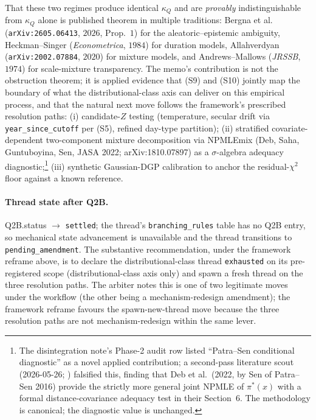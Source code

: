 \documentclass[11pt]{article}
\theoremstyle{definition}
\theoremstyle{plain}
\begin{document}
That these two regimes produce identical $\kappa_{Q}$ and are
\emph{provably} indistinguishable from $\kappa_{Q}$ alone is
published theorem in multiple traditions: Bergna et al.
(\texttt{arXiv:2605.06413}, $2026$, Prop.~$1$) for the aleatoric--epistemic
ambiguity, Heckman--Singer (\emph{Econometrica}, $1984$) for
duration models, Allahverdyan (\texttt{arXiv:2002.07884}, $2020$)
for mixture models, and Andrews--Mallows (\emph{JRSSB}, $1974$)
for scale-mixture transparency. The memo's contribution is not
the obstruction theorem; it is applied evidence that (S9) and
(S10) jointly map the boundary of what the distributional-class
axis can deliver on this empirical process, and that the natural
next move follows the framework's prescribed resolution paths:
(i) candidate-$Z$ testing (temperature, secular drift via
\texttt{year\_since\_cutoff} per (S5), refined day-type partition);
(ii) stratified covariate-dependent two-component mixture
decomposition via NPMLEmix (Deb, Saha, Guntuboyina, Sen, JASA
2022; arXiv:1810.07897) as a $\sigma$-algebra adequacy
diagnostic;\footnote{The disintegration note's Phase-2 audit row
listed ``Patra--Sen conditional diagnostic'' as a novel applied
contribution; a second-pass literature scout (2026-05-26;
)
falsified this, finding that Deb et al.\ (2022, by Sen of
Patra--Sen 2016) provide the strictly more general joint NPMLE
of $\pi^*(x)$ with a formal distance-covariance adequacy test in
their Section~6. The methodology is canonical; the diagnostic
value is unchanged.} (iii) synthetic Gaussian-DGP calibration to
anchor the residual-$\chi^{2}$ floor against a known reference.

\paragraph{Thread state after Q2B.}
Q2B.status $\to$ \texttt{settled}; the thread's
\texttt{branching\_rules} table has no Q2B entry, so mechanical
state advancement is unavailable and the thread transitions to
\texttt{pending\_amendment}. The substantive recommendation,
under the framework reframe above, is to declare the
distributional-class thread \texttt{exhausted} on its
pre-registered scope (distributional-class axis only) and spawn
a fresh thread on the three resolution paths. The arbiter notes
this is one of two legitimate moves under the workflow (the other
being a mechanism-redesign amendment); the framework reframe
favours the spawn-new-thread move because the three resolution
paths are not mechanism-redesign within the same lever.
\end{document}
